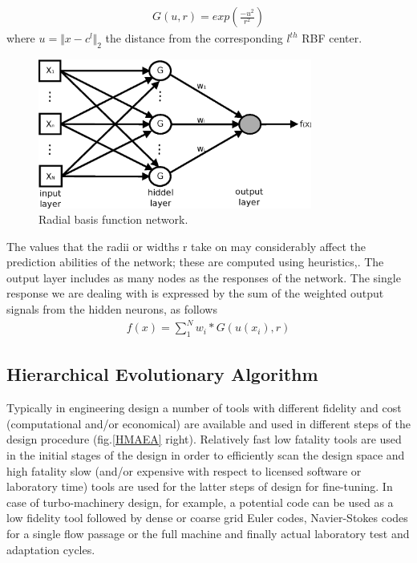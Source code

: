 \begin{eqnarray}
	G(u,r)=exp(\frac{-u^2}{r^2})
	\label{RBFa}
\end{eqnarray}  
where $u=\Vert x-c^l \Vert_2$ the distance from the corresponding $l^{th}$ RBF center.

\begin{figure}[h!]
\centering
\includegraphics[width=90mm]{RBF.eps} 
\caption{Radial basis function network.}
\label{rbf1}
\end{figure}
The values that the radii or widths r take on may considerably affect the prediction abilities of the network; these are computed using heuristics,\cite{Haykin}. The output layer includes as many nodes as the responses of the network. The single response we are dealing with is expressed by the sum of the weighted output signals from the hidden neurons, as follows             
\begin{eqnarray}
	f(x)=\sum _1^N w_i*G(u(x_i),r)
\end{eqnarray}  


\subsection{Hierarchical Evolutionary Algorithm}
Typically in engineering design a number of tools with different fidelity and cost (computational and/or economical) are available and used in different steps of the design procedure (fig.\ref{HMAEA} right). Relatively fast low fatality tools are used in the initial stages of the design in order to efficiently scan the design space and high fatality slow (and/or expensive with respect to licensed software or laboratory time) tools are used for the latter steps of design for fine-tuning. In case of turbo-machinery design, for example, a potential code can be used as a low fidelity tool followed by dense or coarse grid Euler codes, Navier-Stokes codes for a single flow passage or the full machine and finally actual laboratory test and adaptation cycles.    



